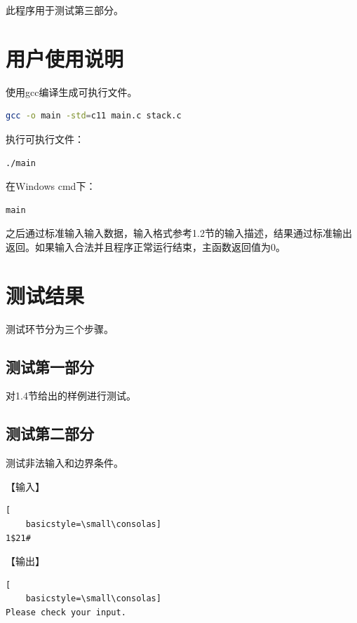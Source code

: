 \documentclass{article}
\begin{document}
此程序用于测试第三部分。

\section{用户使用说明}

使用gcc编译生成可执行文件。

\begin{lstlisting}[language={bash},
    basicstyle=\small\consolas]
gcc -o main -std=c11 main.c stack.c
\end{lstlisting}

执行可执行文件：

\begin{lstlisting}[language={bash},
    basicstyle=\small\consolas]
./main
\end{lstlisting}

在Windows cmd下：

\begin{lstlisting}[language={bash},
    basicstyle=\small\consolas]
main
\end{lstlisting}

之后通过标准输入输入数据，输入格式参考1.2节的输入描述，结果通过标准输出返回。如果输入合法并且程序正常运行结束，主函数返回值为0。

\section{测试结果}

测试环节分为三个步骤。

\subsection{测试第一部分}

对1.4节给出的样例进行测试。

\subsection{测试第二部分}

测试非法输入和边界条件。

【输入】

\begin{lstlisting}[
    basicstyle=\small\consolas]
1$21#
\end{lstlisting}

【输出】

\begin{lstlisting}[
    basicstyle=\small\consolas]
Please check your input.
\end{lstlisting}
\end{document}
